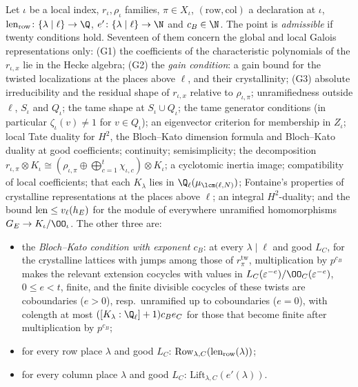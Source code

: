 \begin{definition}\label{pf:linkN-adm:def-adm}
Let $\iota$ be a local index, $r_\iota,\rho_\iota$ families, $\pi\in X_\iota$, $(\mathrm{row},\mathrm{col})$ a declaration
at $\iota$, $\linkNadmlen_{\mathrm{row}}\colon\{\lambda\mid\ell\}\to\Q$, $e'\colon\{\lambda\mid\ell\}\to\N$ and
$c_B\in\N$. The point is \emph{admissible} if twenty conditions hold. Seventeen of
them concern the global and local Galois representations only: (G1) the coefficients of the characteristic
polynomials of the $r_{\iota,x}$ lie in the Hecke algebra; (G2) the \emph{gain condition}: a gain bound for the twisted
localizations at the places above $\ell$, and their crystallinity; (G3) absolute irreducibility and the residual shape
of $r_{\iota,x}$ relative to $\rho_{\iota,\pi}$; unramifiedness outside $\ell$, $S_\iota$ and $Q_\iota$; the tame shape at
$S_\iota\cup Q_\iota$; the tame generator conditions (in particular $\zeta_\iota(v)\ne1$ for $v\in Q_\iota$); an
eigenvector criterion for membership in $Z_\iota$; local Tate duality for $H^2$, the Bloch--Kato dimension formula and
Bloch--Kato duality at good coefficients; continuity; semisimplicity; the decomposition $r_{\iota,\pi}\otimes K_\iota\cong
(\rho_{\iota,\pi}\oplus\bigoplus_{c=1}^t\chi_{\iota,c})\otimes K_\iota$; a cyclotomic inertia image; compatibility of local
coefficients; that each $K_\lambda$ lies in $\Q_\ell(\mu_{\lcm(\ell,N)})$; Fontaine's properties of crystalline
representations at the places above $\ell$; an integral $H^2$-duality; and the bound $\operatorname{len}\le v_\ell(h_E)$ for
the module of everywhere unramified homomorphisms $G_E\to K_\iota/\OO_\iota$. The other three are:
\begin{itemize}
\item[(TB)] the \emph{Bloch--Kato condition with exponent $c_B$}: at every $\lambda\mid\ell$ and good
  $L_C$, for the crystalline lattices with jumps among those of $r^{\mathrm{tw}}_\pi$, multiplication by $p^{c_B}$ makes the
  relevant extension cocycles with values in $L_C(\varepsilon^{-e})/\OO_C(\varepsilon^{-e})$, $0\le e<t$, finite, and
  the finite divisible cocycles of these twists are coboundaries ($e>0$), resp.\ unramified up to coboundaries ($e=0$),
  with colength at most $([K_\lambda:\Q_\ell]+1)c_Be_C$ for those that become finite after multiplication by
  $p^{c_B}$;
\item[(Row)] for every row place $\lambda$ and good $L_C$: $\mathrm{Row}_{\lambda,C}(\operatorname{len}_{\mathrm{row}}(\lambda))$;
\item[(Lift)] for every column place $\lambda$ and good $L_C$: $\mathrm{Lift}_{\lambda,C}(e'(\lambda))$.
\end{itemize}
\end{definition}

